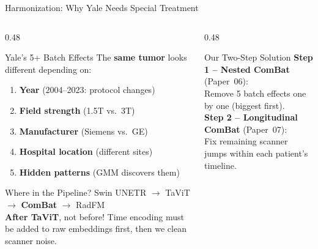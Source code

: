 \documentclass[aspectratio=169,xcolor=dvipsnames]{beamer}
\begin{document}
\begin{frame}{Harmonization: Why Yale Needs Special Treatment}
    \begin{columns}
        \begin{column}{0.48\textwidth}
            \begin{alertblock}{Yale's 5+ Batch Effects}
                \small
                The \textbf{same tumor} looks different depending on:
                \begin{enumerate}
                    \item \textbf{Year} (2004--2023: protocol changes)
                    \item \textbf{Field strength} (1.5T vs.\ 3T)
                    \item \textbf{Manufacturer} (Siemens vs.\ GE)
                    \item \textbf{Hospital location} (different sites)
                    \item \textbf{Hidden patterns} (GMM discovers them)
                \end{enumerate}
            \end{alertblock}

            \vspace{0.2em}

            \begin{block}{\small Where in the Pipeline?}
                \scriptsize
                Swin UNETR $\to$ TaViT $\to$ \textbf{ComBat} $\to$ RadFM\\[0.2em]
                \textbf{After TaViT}, not before! Time encoding must be added to raw embeddings first, then we clean scanner noise.
            \end{block}
        \end{column}

        \begin{column}{0.48\textwidth}
            \begin{block}{\small Our Two-Step Solution}
                \small
                \textbf{Step 1 -- Nested ComBat} (Paper~06):\\[0.1em]
                \scriptsize Remove 5 batch effects one by one (biggest first).\\
                \small\textbf{Step 2 -- Longitudinal ComBat} (Paper~07):\\[0.1em]
                \scriptsize Fix remaining scanner jumps within each patient's timeline.
            \end{block}


\end{column}
\end{columns}
\end{frame}
\end{document}
